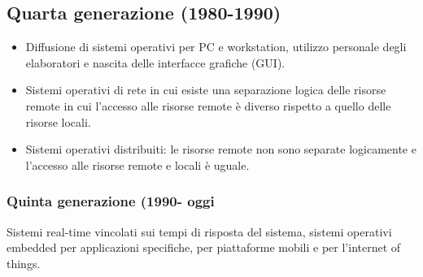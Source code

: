 \subsection{Quarta generazione (1980-1990)}
\begin{itemize}
\item Diffusione di sistemi operativi per PC e workstation, utilizzo personale degli elaboratori e nascita delle interfacce grafiche (GUI).
\item Sistemi operativi di rete in cui esiste una separazione logica delle risorse remote in cui l'accesso alle risorse remote \`e diverso rispetto a quello 
delle risorse locali.
\item Sistemi operativi distribuiti: le risorse remote non sono separate logicamente e l'accesso alle risorse remote e locali \`e uguale. 
\end{itemize}
\subsubsection{Quinta generazione (1990- oggi}
Sistemi real-time vincolati sui tempi di risposta del sistema, sistemi operativi embedded per applicazioni specifiche, per piattaforme mobili e per 
l'internet of things. 
